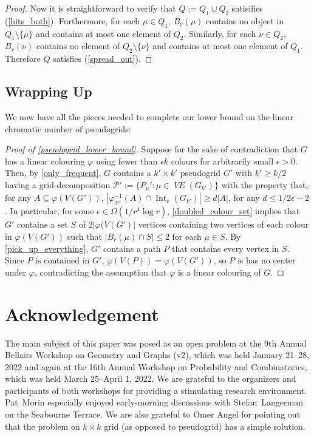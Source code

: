 \documentclass{patmorin}
\DeclareMathOperator{\interior}{Int}
\DeclareMathOperator{\VE}{\mathit{VE}}
\begin{document}
\begin{proof}
  Now it is straightforward to verify that $Q:=Q_1\cup Q_2$ satisifies (\ref{hits_both}).  Furthermore, for each $\mu\in Q_1$, $B_r(\mu)$ contains no object in $Q_1\setminus\{\mu\}$ and contains at most one element of $Q_2$.  Similarly, for each $\nu\in Q_2$, $B_r(\nu)$ contains no element of $Q_2\setminus\{\nu\}$ and contains at most one element of $Q_1$.  Therefore $Q$ satisfies (\ref{spread_out}).
\end{proof}

\subsection{Wrapping Up}
\label{wrapping_up}

We now have all the pieces needed to complete our lower bound on the linear chromatic number of pseudogrids:

\begin{proof}[Proof of \cref{pseudogrid_lower_bound}]
  Suppose for the sake of contradiction that $G$ has a linear colouring $\varphi$ using fewer than $\epsilon k$ colours for arbitrarily small $\epsilon >0$.  Then, by \cref{only_frequent}, $G$ contains a $k'\times k'$ pseudogrid $G'$ with $k'\ge k/2$ having a grid-decomposition $\mathcal{P}':=\{P_\mu':\mu\in \VE(G_{k'})\}$ with the property that, for any $A\subseteq\varphi(V(G'))$, $|\varphi^{-1}_{\mathcal{P'}}(A)\cap\interior_r(G_{k'})|\ge d|A|$, for any $d\le 1/2\epsilon-2$.  In particular, for some $\epsilon \in \Omega(1/r^4\log r)$, \cref{doubled_colour_set} implies that $G'$ contains a set $S$ of $2|\varphi(V(G')|$ vertices containing two vertices of each colour in $\varphi(V(G'))$ such that $|B_r(\mu)\cap S|\le 2$ for each $\mu\in S$.  By \cref{pick_up_everything}, $G'$ contains a path $P$ that contains every vertex in $S$.  Since $P$ is contained in $G'$, $\varphi(V(P))=\varphi(V(G'))$, so $P$ is has no center under $\varphi$, contradicting the assumption that $\varphi$ is a linear colouring of $G$.
\end{proof}


\section*{Acknowledgement}

The main subject of this paper was posed as an open problem at the 9th Annual Bellairs Workshop on Geometry and Graphs (v2), which was held January 21--28, 2022 and again at the 16th Annual Workshop on Probability and Combinatorics, which was held March 25--April 1, 2022. We are grateful to the organizers and participants of both workshops for providing a stimulating research environment.
Pat~Morin especially enjoyed early-morning discussions with Stefan~Langerman on the Seabourne Terrace. We are also grateful to Omer Angel for pointing out that the problem on $k\times k$ grid (as opposed to pseudogrid) has a simple solution.
\end{document}
